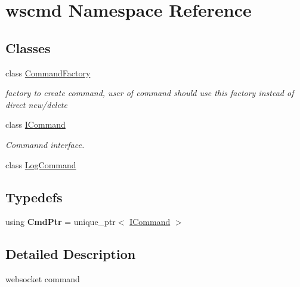 \hypertarget{namespacewscmd}{}\section{wscmd Namespace Reference}
\label{namespacewscmd}
\subsection*{Classes}
\begin{DoxyCompactItemize}
\item 
class \hyperlink{classwscmd_1_1CommandFactory}{Command\+Factory}
\begin{DoxyCompactList}\small\item\em factory to create command, user of command should use this factory instead of direct new/delete \end{DoxyCompactList}\item 
class \hyperlink{classwscmd_1_1ICommand}{I\+Command}
\begin{DoxyCompactList}\small\item\em Commannd interface. \end{DoxyCompactList}\item 
class \hyperlink{classwscmd_1_1LogCommand}{Log\+Command}
\end{DoxyCompactItemize}
\subsection*{Typedefs}
\begin{DoxyCompactItemize}
\item 
\mbox{\label{namespacewscmd_ac6591e60a584246791ade6a96d22702b}} 
using {\bfseries Cmd\+Ptr} = unique\+\_\+ptr$<$ \hyperlink{classwscmd_1_1ICommand}{I\+Command} $>$
\end{DoxyCompactItemize}


\subsection{Detailed Description}
websocket command 